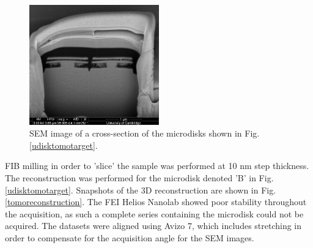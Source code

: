 \begin{figure}[h]
	\centering
	\includegraphics[width=0.5\textwidth]{Figs/Ch4/slice}
	\caption {SEM image of a cross-section of the microdisks shown in Fig.\ref{udisktomotarget}.}
	\label{slice}
\end{figure}
\FloatBarrier 

FIB milling in order to 'slice' the sample was performed at 10 nm step thickness. The reconstruction was performed for the microdisk denoted 'B' in Fig.\ref{udisktomotarget}. Snapshots of the 3D reconstruction are shown in Fig.\ref{tomoreconstruction}. The FEI Helios Nanolab showed poor stability throughout the acquisition, as such a complete series containing the microdisk could not be acquired. The datasets were aligned using Avizo 7, which includes stretching in order to compensate for the acquisition angle for the SEM images.


